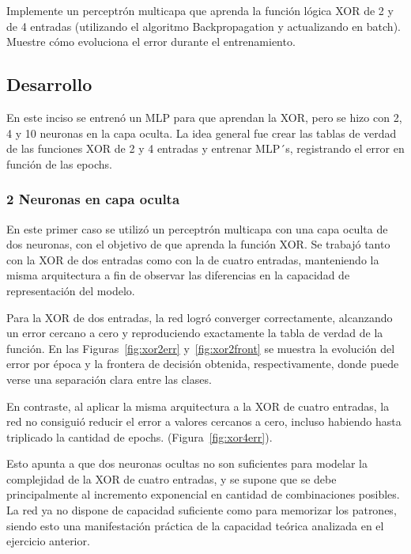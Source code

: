 \documentclass[11pt]{article} %
\begin{document}
Implemente un perceptrón multicapa que aprenda la función lógica XOR de 2 y de 4 entradas (utilizando el algoritmo Backpropagation y actualizando en batch). Muestre cómo evoluciona el error durante el entrenamiento.

\subsection{Desarrollo}

En este inciso se entrenó un MLP para que aprendan la XOR, pero se hizo con 2, 4 y 10 neuronas en la capa oculta. La idea general fue crear las tablas de verdad de las funciones XOR de 2 y 4 entradas y entrenar MLP´s, registrando el error en función de las epochs.

\subsubsection{2 Neuronas en capa oculta}

En este primer caso se utilizó un perceptrón multicapa con una capa oculta de dos neuronas, con el objetivo de que aprenda la función XOR.
Se trabajó tanto con la XOR de dos entradas como con la de cuatro entradas, manteniendo la misma arquitectura a fin de observar las diferencias en la capacidad de representación del modelo.

Para la XOR de dos entradas, la red logró converger correctamente, alcanzando un error cercano a cero y reproduciendo exactamente la tabla de verdad de la función.
En las Figuras~\ref{fig:xor2err} y~\ref{fig:xor2front} se muestra la evolución del error por época y la frontera de decisión obtenida, respectivamente, donde puede verse una separación clara entre las clases.

En contraste, al aplicar la misma arquitectura a la XOR de cuatro entradas, la red no consiguió reducir el error a valores cercanos a cero, incluso habiendo hasta triplicado la cantidad de epochs. (Figura~\ref{fig:xor4err}).

Esto apunta a que dos neuronas ocultas no son suficientes para modelar la complejidad de la XOR de cuatro entradas, y se supone que se debe principalmente al incremento exponencial en cantidad de combinaciones posibles. La red ya no dispone de capacidad suficiente como para memorizar los patrones, siendo esto una manifestación práctica de la capacidad teórica analizada en el ejercicio anterior.
\end{document}
